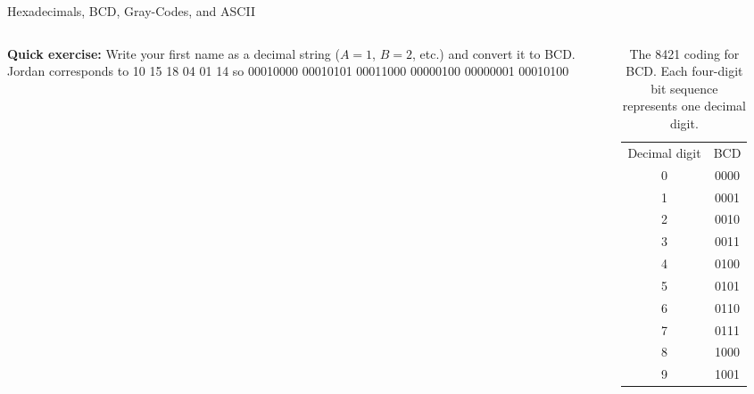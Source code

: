 \documentclass{beamer}
\begin{document}
\begin{frame}{Hexadecimals, BCD, Gray-Codes, and ASCII}
\small
\begin{columns}[T]
\begin{column}{0.5\textwidth}
\textbf{Quick exercise:} Write your first name as a decimal string ($A=1$, $B=2$, etc.) and convert it to BCD. \\ \vspace{0.5cm}
Jordan corresponds to 10 15 18 04 01 14 so 00010000 00010101 00011000 00000100 00000001 00010100
\end{column}
\begin{column}{0.5\textwidth}
\begin{table}
\centering
\begin{tabular}{c c}
Decimal digit & BCD \\
0 & 0000 \\
1 & 0001 \\
2 & 0010 \\
3 & 0011 \\
4 & 0100 \\
5 & 0101 \\
6 & 0110 \\
7 & 0111 \\
8 & 1000 \\
9 & 1001 \\
\end{tabular}
\caption{\label{tab:bcd2} \small The 8421 coding for BCD.  Each four-digit bit sequence represents one decimal digit.}
\end{table}
\end{column}
\end{columns}
\end{frame}
\end{document}

